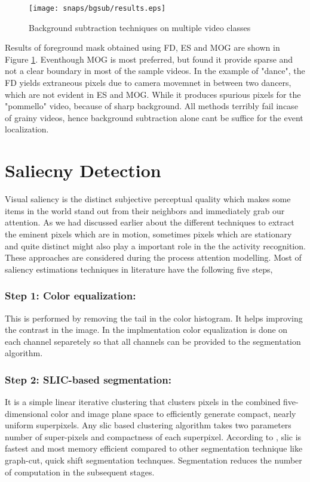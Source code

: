 \begin{figure}[htpb]
   \begin{center}
	    \texttt{[image: snaps/bgsub/results.eps]}     
     \caption {Background subtraction techniques on multiple video classes}
   \label{fig:bgsub}
   \end{center}
 \end{figure}
\par Results of foreground mask obtained using FD, ES and MOG are shown in Figure \ref{fig:bgsub}. Eventhough MOG is most preferred, but found it provide sparse and not a clear boundary in most of the sample videos. In the example of "dance", the FD yields extraneous pixels due to camera movemnet in between two dancers, which are not evident in ES and MOG. While it produces spurious pixels for the "pommello" video, because of sharp background. All methods terribly fail incase of grainy videos, hence background subtraction alone cant be suffice for the event localization.

\section{Saliecny Detection}
Visual saliency is the distinct subjective perceptual quality which makes some items in the world stand out from their neighbors and immediately grab our attention.
As we had discussed earlier about the different techniques to extract the eminent pixels which are in motion, sometimes pixels which are stationary and quite distinct might also play a important role in the the activity recognition. These approaches are considered during the process attention modelling. Most of saliency estimations techniques in literature have the following five steps,

\subsubsection{Step 1: Color equalization:} This is performed by removing the tail in the color histogram. It helps improving the contrast in the image. In the implmentation color equalization is done on each channel separetely so that all channels can be provided to the segmentation algorithm.

\subsubsection{Step 2: SLIC-based segmentation:}  It is a simple linear iterative clustering that clusters pixels in the combined five-dimensional color and image plane space to efficiently generate compact, nearly uniform superpixels. Any slic based clustering algorithm takes two parameters number of super-pixels and compactness of each superpixel. According to \cite{slic}, slic is fastest and most memory efficient compared to  other segmentation technique like graph-cut, quick shift segmentation technques. Segmentation reduces the number of computation in the subsequent stages.


